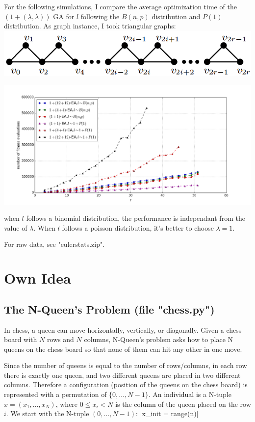 \documentclass{article}
\begin{document}
For the following simulations, I compare the average optimization time of the $(1+(\lambda, \lambda))$ GA for $l$ following the $B(n, p)$ distribution and $P(1)$ distribution. As graph instance, I took triangular graphs: \\
\includegraphics{img/triangle_graph.png} 

\includegraphics[scale=0.5]{img/stat_euler.png} 

when $l$ follows a binomial distribution, the performance is independant from the value of $\lambda$. 
When $l$ follows a poisson distribution, it's better to choose $\lambda=1$.

For raw data, see "eulerstats.zip".

\section{Own Idea}

\subsection{The N-Queen's Problem  (file "chess.py")}
In chess, a queen can move  horizontally, vertically, or diagonally. Given a chess board with $N$ rows and $N$ columns, N-Queen's problem asks how to place N queens on the chess board so that none of them can hit any other in one move.


Since the number of queens is equal to the number of rows/columns, in each row there is exactly one queen, and two different queens are placed in two different columns. Therefore a configuration (position of the queens on the chess board) is represented with a permutation of $\{0, ..., N-1\}$.
An individual is a N-tuple $x = (x_1, ..., x_N)$, where $0 \leq x_i < N$  is the column of the queen placed on the row $i$. We start with the N-tuple $(0, ..., N-1)$: |x_init = range(n)|
\end{document}
